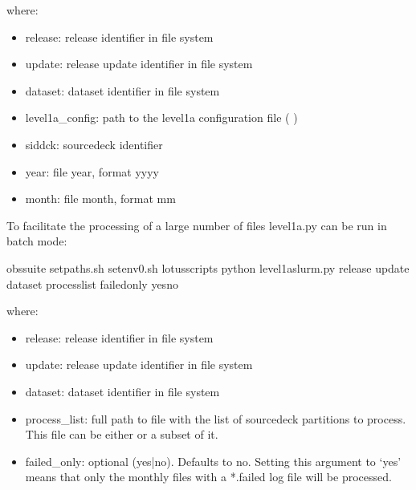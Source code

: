 \documentclass[letterpaper,10pt,english]{sphinxmanual}
\begin{document}
where:
\begin{itemize}
\item {}
release: release identifier in file system

\item {}
update: release update identifier in file system

\item {}
dataset: dataset identifier in file system

\item {}
level1a\_config: path to the level1a configuration file ( {\hyperref[\detokenize{index:level1a-config-file}]{}})

\item {}
sid\sphinxhyphen{}dck: source\sphinxhyphen{}deck identifier

\item {}
year: file year, format yyyy

\item {}
month: file month, format mm

\end{itemize}

To facilitate the processing of a large number of files level1a.py can be run
in batch mode:

\begin{sphinxVerbatim}[commandchars=\\\{\}]
 obs\PYGZhy{}suite
 setpaths.sh
 setenv0.sh
 lotus\PYGZus{}scripts
python level1a\PYGZus{}slurm.py release update dataset  process\PYGZus{}list \PYGZhy{}\PYGZhy{}failed\PYGZus{}only yesno
\end{sphinxVerbatim}

where:
\begin{itemize}
\item {}
release: release identifier in file system

\item {}
update: release update identifier in file system

\item {}
dataset: dataset identifier in file system

\item {}
process\_list: full path to file with the list of source\sphinxhyphen{}deck partitions to
process. This file can be either {\hyperref[\detokenize{index:process-list-file}]{}} or a subset of it.

\item {}
failed\_only: optional (yes|no). Defaults to no. Setting this argument to ‘yes’
means that only the monthly files with a *.failed log file will be processed.

\end{itemize}
\end{document}
